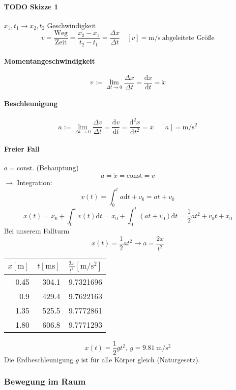 \documentclass[a4paper]{scrartcl}
\theoremstyle{definition}
\theoremstyle{plain}
\theoremstyle{plain}
\theoremstyle{remark}
\theoremstyle{remark}
\theoremstyle{remark}
\begin{document}
\paragraph{{\bfseries\sffamily TODO} Skizze 1}
\label{sec-2-1-1-1}
$x_1,t_1 \longrightarrow x_2, t_2$
Geschwindigkeit
\[v = \frac{\text{Weg}}{\text{Zeit}} = \frac{x_2 - x_1}{t_2 - t_1} = \frac{\Delta x}{\Delta t}\quad [v] = \si{\meter\per\second}~\text{abgeleitete Größe}\]
\paragraph{Momentangeschwindigkeit}
\label{sec-2-1-1-2}
\[v := \lim_{\Delta t\to 0} \frac{\Delta{x}}{\Delta t} = \frac{\mathrm{d}x}{\mathrm{d}t} = \dot{x}\]
\paragraph{Beschleunigung}
\label{sec-2-1-1-3}
\[a := \lim_{\Delta t\to 0} \frac{\Delta{v}}{\Delta{t}} = \frac{\mathrm{d}v}{\mathrm{d}t} = \frac{\mathrm{d}^2x}{\mathrm{d}t^2} = \ddot{x}\quad [a]=\si{\meter\per\second\squared}\]
\paragraph{Freier Fall}
\label{sec-2-1-1-4}
$a = \text{const.}$ (Behauptung)
\[a=\ddot{x} = \text{const} = \dot{v}\]
$\rightarrow$ Integration: \[v(t) = \int_0^t a\mathrm{d}t + v_0 = a t + v_0\]
\[x(t) = x_0 + \int_0^t v(t)\mathrm{d}t = x_0 + \int_0^t (a t + v_0)\mathrm{d}t = \frac{1}{2}a t^2 + v_0 t + x_0\]
Bei unserem Fallturm
\[x(t) = \frac{1}{2}a t^2 \rightarrow a = \frac{2 x}{t^2}\]
\begin{center}
\begin{tabular}{rrr}
$x[\si{\meter}]$ & $t[\si{\milli\second}]$ & $\frac{2x}{t^2}[\si{\meter\per\square\second}]$\\
\hline
0.45 & 304.1 & 9.7321696\\
0.9 & 429.4 & 9.7622163\\
1.35 & 525.5 & 9.7772861\\
1.80 & 606.8 & 9.7771293\\
\end{tabular}
\end{center}
\[x(t) = \frac{1}{2} g t^2,~g=\SI{9.81}{\meter\per\square\second}\]
Die Erdbeschleunigung $g$ ist für alle Körper gleich (Naturgesetz).
\subsubsection{Bewegung im Raum}
\label{sec-2-1-2}
\end{document}

